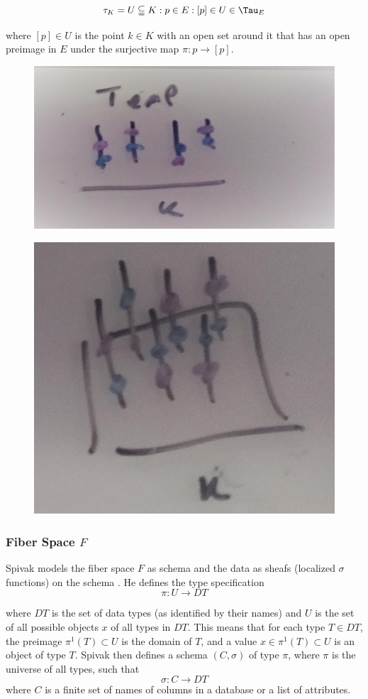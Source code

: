 \documentclass[../main.tex]{subfiles}
\begin{document}
\begin{equation}
\tau_K = {U\subseteqq K: {p \in E: [p] \in U}\in \Tau_E}
\end{equation}

where $[p] \in U$ is the point $k \in K$ with an open set around it that has an open  preimage in $E$ under the surjective map $\pi: p \rightarrow [p]$. 


\begin{figure}[ht]
    \includegraphics[width=0.2\linewidth]{figures/sections/math/temp_1k.png}
\end{figure}
\begin{figure}[ht]
    \includegraphics[width=0.2\linewidth]{figures/sections/math/temp_2k.png}
\end{figure}



\subsubsection{Fiber Space $F$}
Spivak models the fiber space $F$ as schema and the data as sheafs (localized $\sigma$ functions) on the schema \cite{spivakSIMPLICIALDATABASES}. He defines the type specification 
\begin{equation}
\pi: U \rightarrow DT
\end{equation}

where $DT$ is the set of data types (as identified by their names) and $U$ is the set of all possible objects $x$ of all types in $DT$. This means that for each type $T\in DT$, the preimage $\pi^{1}(T)\subset U $ is the domain of $T$, and a value $x \in \pi^{1}(T)\subset U$ is an object of type $T$. Spivak then defines a schema $(C, \sigma)$ of type $\pi$, where $\pi$ is the universe of all types, such that 
\begin{equation}
\sigma: C \rightarrow DT
\end{equation}
where $C$ is a finite set of names of columns in a database or a list of attributes. 
\end{document}
